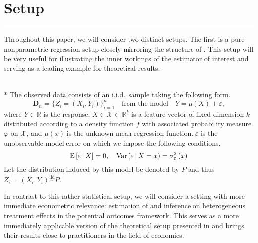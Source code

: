 \section{Setup}\label{sec:setup}
\hrule
Throughout this paper, we will consider two distinct setups.
The first is a pure nonparametric regression setup closely mirroring the structure of \citet{demirkaya_optimal_2024}.
This setup will be very useful for illustrating the inner workings of the estimator of interest and serving as a leading example for theoretical results.
\begin{boxD}
	\begin{asm}\label{asm:npr_dgp}\mbox{}\\*
		The observed data consists of an i.i.d.\ sample taking the following form.
		\begin{equation}\label{DGP1}
			\mathbf{D}_n = \{Z_{i} = (X_{i}, Y_{i})\}_{i = 1}^{n}
			\quad \text{from the model} \quad
			Y = \mu(X) + \varepsilon,
		\end{equation}
		where $Y \in \mathbb{R}$ is the response, $X \in \mathcal{X} \subset \mathbb{R}^k$ is a feature vector of fixed dimension $k$ distributed according to a density function $f$ with associated probability measure $\varphi$ on $\mathcal{X}$, and $\mu(x)$ is the unknown mean regression function.
		$\varepsilon$ is the unobservable model error on which we impose the following conditions.
		\begin{equation}
			\mathbb{E}\left[\varepsilon \, \middle| \, X\right] = 0, \quad
			\text{Var}\left(\varepsilon \, \middle| \, X = x\right) = \sigma_{\varepsilon}^2\left(x\right)
		\end{equation}
		Let the distribution induced by this model be denoted by $P$ and thus $Z_{i} = \left(X_{i}, Y_{i}\right) \overset{\text{iid}}{\sim} P$.
	\end{asm}
\end{boxD}
In contrast to this rather statistical setup, we will consider a setting with more immediate econometric relevance: estimation of and inference on heterogeneous treatment effects in the potential outcomes framework.
This serves as a more immediately applicable version of the theoretical setup presented in \citet{ritzwoller_simultaneous_2024} and brings their results close to practitioners in the field of economics.
